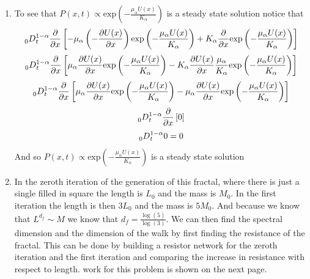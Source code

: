 \documentclass[12pt]{amsart}
\theoremstyle{definition}
\begin{document}
\begin{enumerate}
    \item To see that $P(x,t)\propto \text{exp}\left(-\frac{\mu_\alpha U(x)}{K_\alpha}\right)$ is a steady state solution notice that 
        $$\prescript{}{0}{D}^{1-\alpha}_{t} \frac{\partial}{\partial x}\left[-\mu_\alpha \left(-\frac{\partial U(x)}{\partial x}\right) \text{exp}\left(-\frac{\mu_\alpha U(x)}{K_\alpha}\right)+K_\alpha \frac{\partial}{\partial x}\text{exp}\left(-\frac{\mu_\alpha U(x)}{K_\alpha}\right)\right]$$
        $$\prescript{}{0}{D}^{1-\alpha}_{t} \frac{\partial}{\partial x}\left[\mu_\alpha \frac{\partial U(x)}{\partial x} \text{exp}\left(-\frac{\mu_\alpha U(x)}{K_\alpha}\right)-K_\alpha \frac{\partial U(x)}{\partial x}\frac{\mu_\alpha }{K_\alpha}\text{exp}\left(-\frac{\mu_\alpha U(x)}{K_\alpha}\right)\right]$$
        $$\prescript{}{0}{D}^{1-\alpha}_{t} \frac{\partial}{\partial x}\left[\mu_\alpha \frac{\partial U(x)}{\partial x} \text{exp}\left(-\frac{\mu_\alpha U(x)}{K_\alpha}\right)-\mu_\alpha\frac{\partial U(x)}{\partial x} \text{exp}\left(-\frac{\mu_\alpha U(x)}{K_\alpha}\right)\right]$$
        $$\prescript{}{0}{D}^{1-\alpha}_{t} \frac{\partial}{\partial x}\left[0\right]$$
        $$\prescript{}{0}{D}^{1-\alpha}_{t}0=0$$
        And so $P(x,t)\propto \text{exp}\left(-\frac{\mu_\alpha U(x)}{K_\alpha}\right)$ is a steady state solution

    \item In the zeroth iteration of the generation of this fractal, where there is just a single filled in square the length is $L_0$ and the mass is $M_0$. In the first iteration the length is then $3L_0$ and the mass is $5M_0$. And because we know that $L^{d_f}\sim M$ we know that $d_f=\frac{\log(5)}{\log(3)}$. We can then find the spectral dimension and the dimension of the walk by first finding the resistance of the fractal. This can be done by building a resistor network for the zeroth iteration and the first iteration and comparing the increase in resistance with respect to length. work for this problem is shown on the next page.
    \newpage
    

\end{enumerate}
\end{document}
